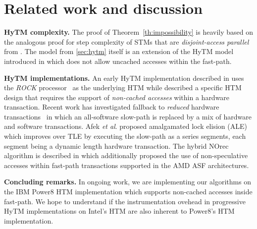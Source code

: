 \section{Related work and discussion}
\label{sec:rel}
%
\vspace{1mm}\noindent\textbf{HyTM complexity.}
The proof of Theorem~\ref{th:impossibility} is heavily based on the analogous proof for step complexity of
STMs that are \emph{disjoint-access parallel} from \cite{prog15-pact}.
The model from \cref{sec:hytm} itself is an extension of the HyTM model introduced in \cite{hytm14disc}
which does not allow uncached accesses within the fast-path.

\vspace{1mm}\noindent\textbf{HyTM implementations.}
An early HyTM implementation described in \cite{damronhytm} uses the \emph{ROCK} processor~\cite{rock} as the underlying HTM
while \cite{kumarhytm} described a specific HTM design that requires the support of \emph{non-cached accesses}
within a hardware transaction. 
Recent work has investigated fallback to \emph{reduced} hardware transactions~\cite{MS13}
in which an all-software slow-path is replaced by a mix of hardware and software transactions. 
Afek \emph{et al}. proposed amalgamated lock elision (ALE)~\cite{ale15} which improves over TLE
by executing the slow-path as a series segments, each segment being a dynamic length hardware transaction.
The hybrid NOrec algorithm is described in \cite{hynorecriegel} which additionally proposed the use of non-speculative accesses
within fast-path transactions supported in the AMD ASF architectures.

\vspace{1mm}\noindent\textbf{Concluding remarks.}
In ongoing work, we are implementing our algorithms on the IBM Power8 HTM implementation which supports
non-cached accesses inside fast-path. We hope to understand if the instrumentation ovehead in
progressive HyTM implementations on Intel's HTM are also inherent to Power8's HTM implementation.